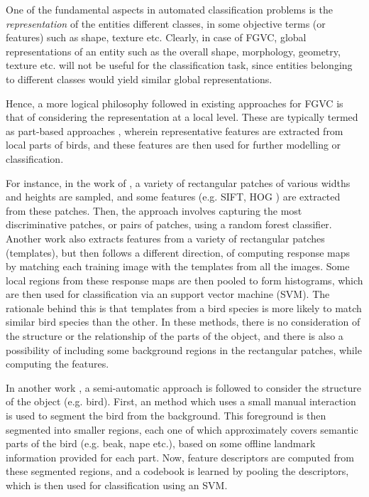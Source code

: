 \documentclass{article}
\begin{document}
One of the fundamental aspects in automated classification problems is the \emph{representation} of the entities different classes, in some objective terms (or features) such as shape, texture etc. Clearly, in case of FGVC, global representations of an entity such as the overall shape, morphology, geometry, texture etc. will not be useful for the classification task, since entities belonging to different classes would yield similar global representations. 

Hence, a more logical philosophy followed in existing approaches for FGVC is that of considering the representation at a local level. These are typically termed as part-based approaches \cite{dpm,hierarchy,poof,random,codebookfree}, wherein representative features are extracted from local parts of birds, and these features are then used for further modelling or classification.  

For instance, in the work of \cite{random}, a variety of rectangular patches of various widths and heights are sampled, and some features (e.g. SIFT, HOG \cite{random,poof}) are extracted from these patches. Then, the approach involves capturing the most discriminative patches, or pairs of patches, using a random forest classifier. Another work \cite{codebookfree} also extracts features from a variety of rectangular patches (templates), but then follows a different direction, of computing response maps by matching each training image with the templates from all the images. Some local regions from these response maps are then pooled to form histograms, which are then used for classification via an support vector machine (SVM). The rationale behind this is that templates from a bird species is more likely to match similar bird species than the other. In these methods, there is no consideration of the structure or the relationship of the parts of the object, and there is also a possibility of including some background regions in the rectangular patches, while computing the features. 

In another work \cite{hierarchy}, a semi-automatic approach is followed to consider the structure of the object (e.g. bird). First, an method which uses a small manual interaction is used to segment the bird from the background. This foreground is then segmented into smaller regions, each one of which approximately covers semantic parts of the bird (e.g. beak, nape etc.), based on some offline landmark information provided for each part. Now, feature descriptors are computed from these segmented regions, and a codebook is learned by pooling the descriptors, which is then used for classification using an SVM.
     
\end{document}

